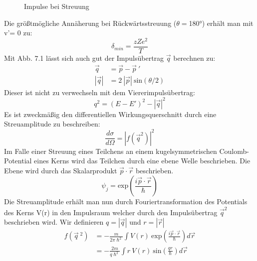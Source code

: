 \documentclass[Ex4_Zusammenfassung.tex]{subfiles}
\begin{document}
\begin{figure}[h]
\centering
	\caption{Impulse bei Streuung}
\end{figure}
Die größtmögliche Annäherung bei Rückwärtsstreuung ($\theta=$180°) erhält man mit v'= 0 zu: 
\begin{equation}
\delta_{min} = \frac{zZe^2}{T}
\end{equation}
Mit Abb. 7.1 lässt sich auch gut der Impulsübertrag $\vec q$ berechnen zu: 
\begin{align}
\vec q &= \vec p - \vec p \ ' \\
|\vec q| &= 2 \  |\vec p| \  \text{sin}(\theta/2)
\end{align} 
Dieser ist nicht zu verwechseln mit dem Viererimpulsübertrag: 
\begin{equation}
q^2 = (E-E')^2 - |\vec q|^2
\end{equation}
Es ist zweckmäßig den differentiellen Wirkungsquerschnitt durch eine Streuamplitude zu beschreiben:
\begin{equation}
\frac{d\sigma}{d\Omega} = |f(\vec q^2)|^2
\end{equation}
Im Falle einer Streuung eines Teilchens an einem kugelsymmetrischen Coulomb-Potential eines Kerns wird das Teilchen durch eine ebene Welle beschrieben. Die Ebene wird durch das Skalarprodukt $ \vec p \cdot \vec r $ beschrieben.
\begin{equation}
\psi_j = \text{exp} \left(\frac{i \vec p \cdot \vec r}{\hslash}\right)
\end{equation}
Die Streuamplitude erhält man nun durch Fouriertransformation des Potentials des Kerns V(r) in den Impulsraum welcher durch den Impulsübertrag $ \vec q^2 $ beschrieben wird. Wir definieren $ q = |\vec q|$ und $ r = |\vec r|$
\begin{align}
f(\vec q \ ^2) &= -\frac{m}{2\pi \hslash^2} \int V(r) \  \text{exp} \left(\frac{i \vec p \cdot \vec r}{\hslash}\right) d \vec r \\
&= -\frac{2m}{q\hslash^2} \int r \  V(r) \  \text{sin} \left(\frac{qr}{\hbar}\right) d\vec r
\end{align}
\end{document}
